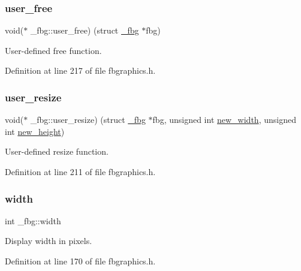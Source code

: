 \mbox{\label{struct__fbg_a88d48b502672cfb8bd2c94ea3feac8d0}} 
\subsubsection{\texorpdfstring{user\+\_\+free}{user\_free}}
{\footnotesize\ttfamily void($\ast$ \+\_\+fbg\+::user\+\_\+free) (struct \hyperlink{struct__fbg}{\+\_\+fbg} $\ast$fbg)}



User-\/defined free function. 



Definition at line 217 of file fbgraphics.\+h.

\mbox{\label{struct__fbg_a68add70dac4b055809c1bcab1e65b18d}} 
\subsubsection{\texorpdfstring{user\+\_\+resize}{user\_resize}}
{\footnotesize\ttfamily void($\ast$ \+\_\+fbg\+::user\+\_\+resize) (struct \hyperlink{struct__fbg}{\+\_\+fbg} $\ast$fbg, unsigned int \hyperlink{struct__fbg_a95859bd418a5cfff155cdb1421d295ef}{new\+\_\+width}, unsigned int \hyperlink{struct__fbg_a509aa5f8f0a94d8313bb4da777aa64bc}{new\+\_\+height})}



User-\/defined resize function. 



Definition at line 211 of file fbgraphics.\+h.

\mbox{\label{struct__fbg_a1d3c76643e4ee424f4d17e27991d5e2e}} 
\subsubsection{\texorpdfstring{width}{width}}
{\footnotesize\ttfamily int \+\_\+fbg\+::width}



Display width in pixels. 



Definition at line 170 of file fbgraphics.\+h.

